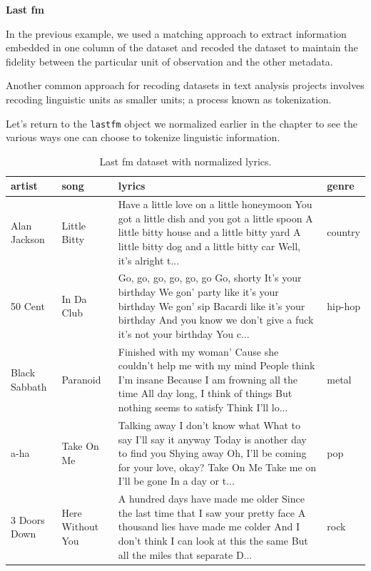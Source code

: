\documentclass[
  letterpaper,
]{scrbook}
\begin{document}
\textbf{Last fm}

In the previous example, we used a matching approach to extract
information embedded in one column of the dataset and recoded the
dataset to maintain the fidelity between the particular unit of
observation and the other metadata.

Another common approach for recoding datasets in text analysis projects
involves recoding linguistic units as smaller units; a process known as
tokenization.

Let's return to the \texttt{lastfm} object we normalized earlier in the
chapter to see the various ways one can choose to tokenize linguistic
information.

\hypertarget{tbl-td-lastfm-clean-end-lines-preview-2}{}
\begin{table}
\caption{\label{tbl-td-lastfm-clean-end-lines-preview-2}Last fm dataset with normalized lyrics. }\tabularnewline

\centering
\begin{tabular}{llll}
\toprule
artist & song & lyrics & genre\\
\midrule
Alan Jackson & Little Bitty & Have a little love on a little honeymoon You got a little dish and you got a little spoon A little bitty house and a little bitty yard A little bitty dog and a little bitty car Well, it's alright t... & country\\
50 Cent & In Da Club & Go, go, go, go, go, go Go, shorty It's your birthday We gon' party like it's your birthday We gon' sip Bacardi like it's your birthday And you know we don't give a fuck it's not your birthday You c... & hip-hop\\
Black Sabbath & Paranoid & Finished with my woman' Cause she couldn't help me with my mind People think I'm insane Because I am frowning all the time All day long, I think of things But nothing seems to satisfy Think I'll lo... & metal\\
a-ha & Take On Me & Talking away I don't know what What to say I'll say it anyway Today is another day to find you Shying away Oh, I'll be coming for your love, okay? Take On Me  Take me on  I'll be gone In a day or t... & pop\\
3 Doors Down & Here Without You & A hundred days have made me older Since the last time that I saw your pretty face A thousand lies have made me colder And I don't think I can look at this the same But all the miles that separate D... & rock\\
\bottomrule
\end{tabular}
\end{table}
\end{document}
